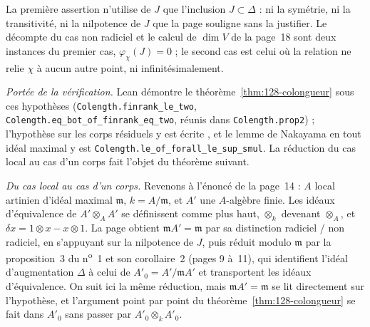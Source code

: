 \begin{remarque}
La première assertion n'utilise de $J$ que l'inclusion $J \subset \Delta$ : ni la symétrie, ni la transitivité, ni la nilpotence de $J$ que la page souligne sans la justifier. Le décompte  du cas non radiciel et le calcul de $\dim V$ de la page~18 sont deux instances du premier cas, $\varphi_\chi(J) = 0$ ; le second cas est celui où la relation ne relie $\chi$ à aucun autre point, ni infinitésimalement.
\end{remarque}

\begingroup\raggedright
\noindent\emph{Portée de la vérification.} Lean démontre le théorème~\ref{thm:128-colongueur} sous ces hypothèses (\texttt{Colength.\allowbreak{}finrank\_le\_two}, \texttt{Colength.\allowbreak{}eq\_bot\_of\_finrank\_eq\_two}, réunis dans \texttt{Colength.\allowbreak{}prop2}) ; l'hypothèse sur les corps résiduels y est écrite , et le lemme de Nakayama en tout idéal maximal y est \texttt{Colength.\allowbreak{}le\_of\_forall\_le\_sup\_smul}. La réduction du cas local au cas d'un corps fait l'objet du théorème suivant.\par\endgroup

\noindent\emph{Du cas local au cas d'un corps.} Revenons à l'énoncé de la page~14 : $A$ local artinien d'idéal maximal $\mathfrak m$, $k = A/\mathfrak m$, et $A'$ une $A$-algèbre finie. Les idéaux d'équivalence de $A' \otimes_A A'$ se définissent comme plus haut, $\otimes_k$ devenant $\otimes_A$, et $\delta x = 1 \otimes x - x \otimes 1$. La page obtient $\mathfrak m A' = \mathfrak m$ par sa distinction radiciel / non radiciel, en s'appuyant sur la nilpotence de $J$, puis réduit modulo $\mathfrak m$ par la proposition~3 du n\textsuperscript{o}~1 et son corollaire~2 (pages 9 à~11), qui identifient l'idéal d'augmentation $\Delta$ à celui de $A'_0 = A'/\mathfrak m A'$ et transportent les idéaux d'équivalence. On suit ici la même réduction, mais $\mathfrak m A' = \mathfrak m$ se lit directement sur l'hypothèse, et l'argument point par point du théorème~\ref{thm:128-colongueur} se fait dans $A'_0$ sans passer par $A'_0 \otimes_k A'_0$.

